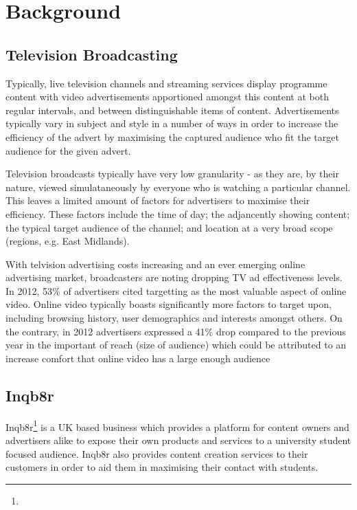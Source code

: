 \section{Background}

	\subsection{Television Broadcasting}

	Typically, live television channels and streaming services display programme content with video advertisements apportioned amongst this content at both regular intervals, and between distinguishable items of content. Advertisements typically vary in subject and style in a number of ways in order to increase the efficiency of the advert by maximising the captured audience who fit the target audience for the given advert.

	Television broadcasts typically have very low granularity - as they are, by their nature, viewed simulataneously by everyone who is watching a particular channel. This leaves a limited amount of factors for advertisers to maximise their efficiency. These factors include the time of day; the adjancently showing content; the typical target audience of the channel; and location at a very broad scope (regions, e.g. East Midlands).

	With telvision advertising costs increasing and an ever emerging online advertising market, broadcasters are noting dropping TV ad effectiveness levels. In 2012, 53\% of advertisers cited targetting as the most valuable aspect of online video. Online video typically boasts significantly more factors to target upon, including browsing history, user demographics and interests amongst others. On the contrary, in 2012 advertisers expressed a 41\% drop compared to the previous year in the important of reach (size of audience) which could be attributed to an increase comfort that online video has a large enough audience

	\subsection{Inqb8r}

	Inqb8r\footnote{} is a UK based business which provides a platform for content owners and advertisers alike to expose their own products and services to a university student focused audience. Inqb8r also provides content creation services to their customers in order to aid them in maximising their contact with students.

